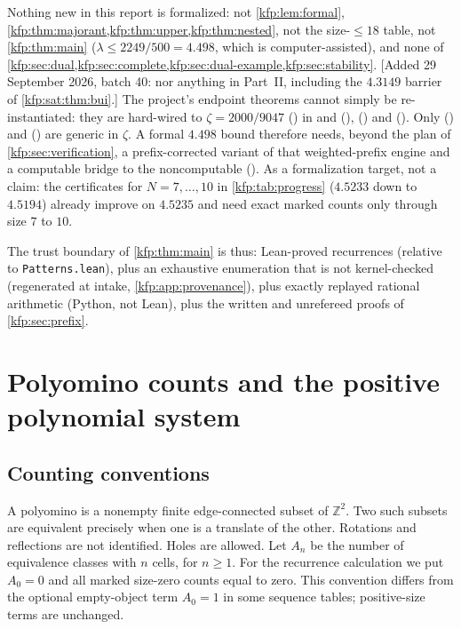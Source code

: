 \documentclass[11pt,a4paper]{article}
\theoremstyle{definition}
\theoremstyle{remark}
\newcommand{\Z}{\mathbb Z}
\begin{document}
Nothing new in this report is formalized: not \cref{kfp:lem:formal},
\cref{kfp:thm:majorant,kfp:thm:upper,kfp:thm:nested}, not the size-$\leq18$
table, not \cref{kfp:thm:main} ($\lambda\leq2249/500=4.498$, which is
computer-assisted), and none of \cref{kfp:sec:dual,kfp:sec:complete,kfp:sec:dual-example,kfp:sec:stability}.
[Added 29 September 2026, batch 40: nor anything in Part~II, including the
$4.3149$ barrier of \cref{kfp:sat:thm:bui}.]
The project's endpoint theorems cannot simply be re-instantiated: they are
hard-wired to $\zeta=2000/9047$ () in
 and 
(),
 () and
 (). Only
 () and
 () are generic in
$\zeta$. A formal $4.498$ bound therefore needs, beyond the plan of
\cref{kfp:sec:verification}, a prefix-corrected variant of that
weighted-prefix engine and a computable bridge to the noncomputable
 ().
As a formalization target, not a claim: the certificates for $N=7,\ldots,10$
in \cref{kfp:tab:progress} ($4.5233$ down to $4.5194$) already improve on
$4.5235$ and need exact marked counts only through size $7$ to $10$.

The trust boundary of \cref{kfp:thm:main} is thus: Lean-proved recurrences
(relative to \texttt{Patterns.lean}), plus an exhaustive enumeration that is
not kernel-checked (regenerated at intake, \cref{kfp:app:provenance}), plus
exactly replayed rational arithmetic (Python, not Lean), plus the written and
unrefereed proofs of \cref{kfp:sec:prefix}.

\section{Polyomino counts and the positive polynomial system}
\label{kfp:sec:system}

\subsection{Counting conventions}
A polyomino is a nonempty finite edge-connected subset of $\Z^2$.
Two such subsets are equivalent precisely when one is a translate of the
other. Rotations and reflections are not identified. Holes are allowed.
Let $A_n$ be the number of equivalence classes with $n$ cells, for $n\geq1$.
For the recurrence calculation we put $A_0=0$ and all marked size-zero
counts equal to zero. This convention differs from the optional empty-object
term $A_0=1$ in some sequence tables; positive-size terms are unchanged.
\end{document}
